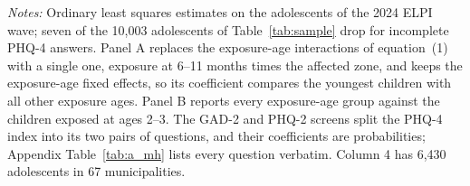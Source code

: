 \begin{table}[htbp]
\begin{threeparttable}
\begin{wpnotes}
\textit{Notes:} Ordinary least squares estimates on the adolescents of the 2024 ELPI wave; seven of the 10,003 adolescents of Table~\ref{tab:sample} drop for incomplete PHQ-4 answers. Panel A replaces the exposure-age interactions of equation~(1) with a single one, exposure at 6--11 months times the affected zone, and keeps the exposure-age fixed effects, so its coefficient compares the youngest children with all other exposure ages. Panel B reports every exposure-age group against the children exposed at ages 2--3. The GAD-2 and PHQ-2 screens split the PHQ-4 index into its two pairs of questions, and their coefficients are probabilities; Appendix Table~\ref{tab:a_mh} lists every question verbatim. \bindef{} \zonedef{} \specdef{} Column 4 has 6,430 adolescents in 67 municipalities. \clusternote{} \starnote
\end{wpnotes}
\end{threeparttable}
\end{table}
